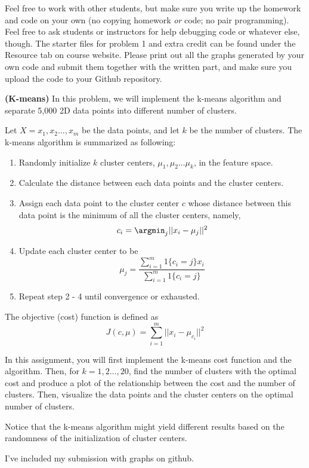 \documentclass[12pt,letterpaper,fleqn]{hmcpset}
\begin{document}
Feel free to work with other students, but make sure you write up the homework
and code on your own (no copying homework \textit{or} code; no pair programming).
Feel free to ask students or instructors for help debugging code or whatever else,
though.
\newline
\newline
The starter files for problem 1 and extra credit can be found under the Resource tab on course website. Please print out all the graphs generated by your own code and submit them together with the written part, and make sure you upload the code to your Github repository.



\begin{problem}[1]
\textbf{(K-means)} In this problem, we will implement the k-means algorithm and separate 5,000 2D data points into different number of clusters.
\newline
\par Let $X = {x_1, x_2 \ldots, x_m} $ be the data points, and let $k$ be the number of clusters. The k-means algorithm is summarized as following:
\begin{enumerate}[1.]
\item Randomly initialize $k$ cluster centers, $\mu_1, \mu_2 \ldots \mu_k$, in the feature space.
\item Calculate the distance between each data points and the cluster centers.
\item Assign each data point to the cluster center $c$ whose distance between this data point is the minimum of all the cluster centers, namely, \[
c_i = \argmin_j ||x_i - \mu_j||^2
\]
\item Update each cluster center to be\[
\mu_j = \frac{\sum_{i=1}^{m}1\{c_i = j\}x_i}{\sum_{i = 1}^{m}1\{c_i = j\}}
\]
\item Repeat step 2 - 4 until convergence or exhausted.
\end{enumerate}
\par 
The objective (cost) function is defined as \[
J(c, \mu) = \sum_{i = 1}^{m}||x_i - \mu_{c_i}||^2
\]

\par In this assignment, you will first implement the k-means cost function and the algorithm. Then, for $k = 1, 2 \ldots, 20$, find the number of clusters with the optimal cost and produce a plot of the relationship between the cost and the number of clusters. Then, visualize the data points and the cluster centers on the optimal number of clusters.
\newline 
\par Notice that the k-means algorithm might yield different results based on the randomness of the initialization of cluster centers.
\end{problem}
\begin{solution}
I've included my submission with graphs on github.
\end{solution}
\newpage
\end{document}
